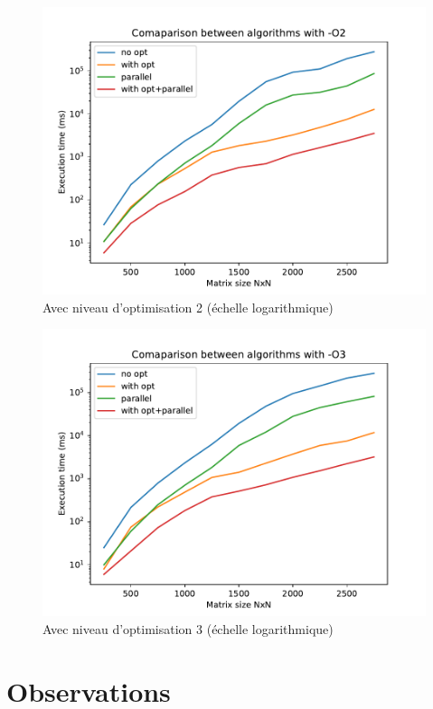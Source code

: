 \documentclass {article}
\begin{document}
\begin{figure}[H]
    \includegraphics[width=\linewidth]{plot/compare_O2.pdf}
    \caption{Avec niveau d'optimisation 2 (échelle logarithmique)}
    \label{fig:compare_O2}
\end{figure}

\begin{figure}[H]
    \includegraphics[width=\linewidth]{plot/compare_O3.pdf}
    \caption{Avec niveau d'optimisation 3 (échelle logarithmique)}
    \label{fig:compare_O3}
\end{figure} 
\section{Observations}
\end{document}
